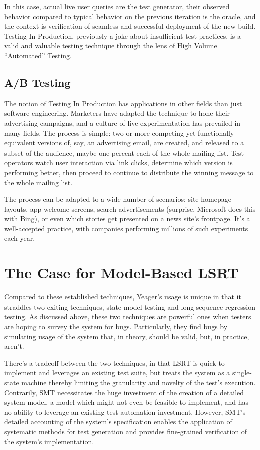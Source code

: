 In this case, actual live user queries are the test generator, their observed behavior compared to typical behavior on the previous iteration is the oracle, and the context is verification of seamless and successful deployment of the new build. Testing In Production, previously a joke about insufficient test practices, is a valid and valuable testing technique through the lens of High Volume ``Automated'' Testing.

\subsection{A/B Testing}
The notion of Testing In Production has applications in other fields than just software engineering. Marketers have adapted the technique to hone their advertising campaigns, and a culture of live experimentation has prevailed in many fields. The process is simple: two or more competing yet functionally equivalent versions of, say, an advertising email, are created, and released to a subset of the audience, maybe one percent each of the whole mailing list. Test operators watch user interaction via link clicks, determine which version is performing better, then proceed to continue to distribute the winning message to the whole mailing list.

The process can be adapted to a wide number of scenarios: site homepage layouts, app welcome screens, search advertisements (surprise, Microsoft does this with Bing), or even which stories get presented on a news site's frontpage. It's a well-accepted practice, with companies performing millions of such experiments each year. \citep{HBR2017ABTest}

\section{The Case for Model-Based LSRT}
Compared to these established techniques, Yeager's usage is unique in that it straddles two exiting techniques, state model testing and long sequence regression testing. As discussed above, these two techniques are powerful ones when testers are hoping to survey the system for bugs. Particularly, they find bugs by simulating usage of the system that, in theory, should be valid, but, in practice, aren't.

There's a tradeoff between the two techniques, in that LSRT is quick to implement and leverages an existing test suite, but treats the system as a single-state machine thereby limiting the granularity and novelty of the test's execution. Contrarily, SMT necessitates the huge investment of the creation of a detailed system model, a model which might not even be feasible to implement, and has no ability to leverage an existing test automation investment. However, SMT's detailed accounting of the system's specification enables the application of systematic methods for test generation and provides fine-grained verification of the system's implementation.

